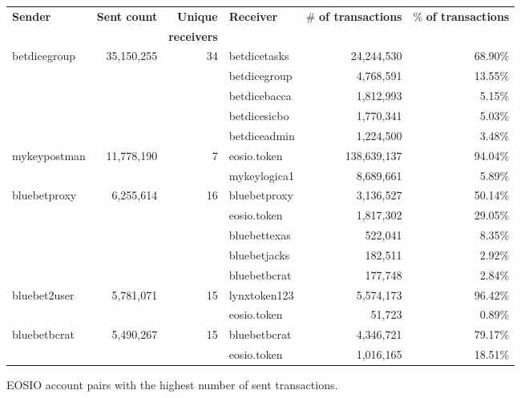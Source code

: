 
\begin{figure*}
    \footnotesize
    \centering
    \begin{tabular}{l r r l r r}
    \toprule
    \bf Sender & \bf Sent count & \bf Unique & \bf Receiver & \# \bf of transactions & \% \bf of transactions\\
    &  & \bf receivers & & &\\
    \midrule
    \multirow{5}{*}{betdicegroup} &  \multirow{5}{*}{35,150,255} & \multirow{5}{*}{34} & betdicetasks & 24,244,530 & 68.90\%\\
    & & & {betdicegroup} & 4,768,591 & 13.55\%\\
    & & & betdicebacca & 1,812,993 & 5.15\%\\
    & & & betdicesicbo & 1,770,341 & 5.03\%\\
    & & & betdiceadmin & 1,224,500 & 3.48\%\\
    \midrule
    \multirow{2}{*}{mykeypostman} & \multirow{2}{*}{11,778,190} & \multirow{2}{*}{7} & eosio.token & 138,639,137 & 94.04\%\\
    & & & mykeylogica1 & 8,689,661 & 5.89\%\\
    \midrule
    \multirow{5}{*}{bluebetproxy} & \multirow{5}{*}{6,255,614} & \multirow{5}{*}{16} & bluebetproxy & 3,136,527 & 50.14\%\\
    & & & eosio.token & 1,817,302 & 29.05\%\\
    & & & bluebettexas & 522,041 & 8.35\%\\
    & & & bluebetjacks & 182,511 & 2.92\%\\
    & & & bluebetbcrat & 177,748 & 2.84\%\\
    \midrule
    \multirow{2}{*}{bluebet2user} & \multirow{2}{*}{5,781,071} & \multirow{2}{*}{15} & lynxtoken123 & 5,574,173 & 96.42\%\\
    & & & eosio.token & 51,723 & 0.89\%\\
    \midrule
    \multirow{2}{*}{bluebetbcrat} & \multirow{2}{*}{5,490,267} & \multirow{2}{*}{15} & bluebetbcrat & 4,346,721 & 79.17\%\\
    & & & eosio.token & 1,016,165 & 18.51\%\\
    \bottomrule
    \end{tabular}
    \caption{EOSIO account pairs with the highest number of sent transactions.}
    \label{tab:eos-account-edges}
\end{figure*}